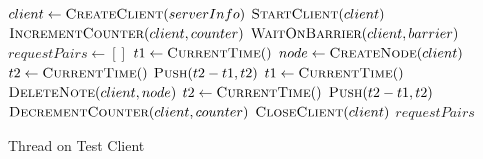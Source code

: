 \begin{algorithm}[ht!]
	\begin{algorithmic}
			\State $client\gets \Call{CreateClient}{serverInfo}$
			\State $\Call{StartClient}{client}$
			\State $\Call{IncrementCounter}{client, counter}$
			\State $\Call{WaitOnBarrier}{client, barrier}$
			\State $requestPairs\gets []$
			\State $t1\gets \Call{CurrentTime}{\null}$
			\State $node\gets \Call{CreateNode}{client}$
			\State $t2 \gets \Call{CurrentTime}{\null}$
			\State $\Call{Push}{t2-t1,t2}$
			\State $t1\gets\Call{CurrentTime}{\null}$
			\State $\Call{DeleteNote}{client, node}$
			\State $t2\gets \Call{CurrentTime}{\null}$
			\State $\Call{Push}{t2-t1,t2}$
			\EndWhile
			\State $\Call{DecrementCounter}{client, counter}$
			\State $\Call{CloseClient}{client}$
			\State \Return $requestPairs$
		\EndProcedure
	\end{algorithmic}
	\caption{Thread on Test Client}
	\label{algo:testClientThread}
\end{algorithm}
